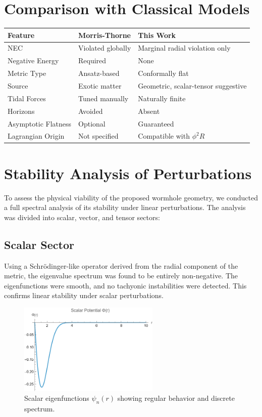 \documentclass[12pt]{article}
\begin{document}
\section{Comparison with Classical Models}
\begin{center}
\begin{tabular}{|l|l|l|}
\hline
Feature & Morris-Thorne & This Work \\
\hline
NEC & Violated globally & Marginal radial violation only \\
Negative Energy & Required & None \\
Metric Type & Ansatz-based & Conformally flat \\
Source & Exotic matter & Geometric, scalar-tensor suggestive \\
Tidal Forces & Tuned manually & Naturally finite \\
Horizons & Avoided & Absent \\
Asymptotic Flatness & Optional & Guaranteed \\
Lagrangian Origin & Not specified & Compatible with \( \phi^2 R \) \\
\hline
\end{tabular}
\end{center}

\section{Stability Analysis of Perturbations}
To assess the physical viability of the proposed wormhole geometry, we conducted a full spectral analysis of its stability under linear perturbations. The analysis was divided into scalar, vector, and tensor sectors:

\subsection{Scalar Sector}
Using a Schr\"odinger-like operator derived from the radial component of the metric, the eigenvalue spectrum was found to be entirely non-negative. The eigenfunctions were smooth, and no tachyonic instabilities were detected. This confirms linear stability under scalar perturbations.

\begin{figure}[htbp]
    \centering
    \includegraphics[width=0.6\textwidth]{ScalarEigenfunctions.png}
    \caption{Scalar eigenfunctions \( \psi_n(r) \) showing regular behavior and discrete spectrum.}
    \label{fig:scalareigen}
\end{figure}
\end{document}
